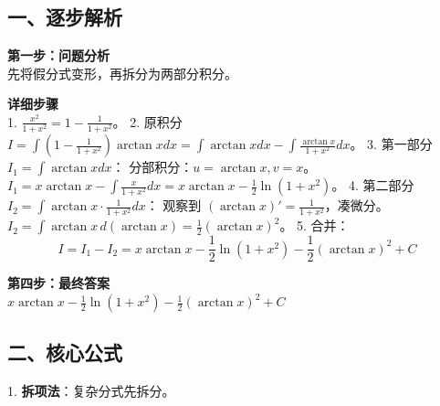\documentclass[12pt, a4paper]{ctexart}
\newenvironment{RedAnalysis}{
    \par
    \color{red} %
}{
    \par
    \color{black} %
}
\begin{document}
\begin{RedAnalysis}

\subsection*{一、逐步解析}

\textbf{第一步：问题分析} \\
先将假分式变形，再拆分为两部分积分。

\textbf{详细步骤} \\
1. $\frac{x^2}{1+x^2} = 1 - \frac{1}{1+x^2}$。
2. 原积分 $I = \int (1 - \frac{1}{1+x^2}) \arctan x dx = \int \arctan x dx - \int \frac{\arctan x}{1+x^2} dx$。
3. 第一部分 $I_1 = \int \arctan x dx$：
   分部积分：$u = \arctan x, v = x$。
   $I_1 = x \arctan x - \int \frac{x}{1+x^2} dx = x \arctan x - \frac{1}{2}\ln(1+x^2)$。
4. 第二部分 $I_2 = \int \arctan x \cdot \frac{1}{1+x^2} dx$：
   观察到 $(\arctan x)' = \frac{1}{1+x^2}$，凑微分。
   $I_2 = \int \arctan x \, d(\arctan x) = \frac{1}{2}(\arctan x)^2$。
5. 合并：
   \[ I = I_1 - I_2 = x \arctan x - \frac{1}{2}\ln(1+x^2) - \frac{1}{2}(\arctan x)^2 + C \]

\textbf{第四步：最终答案} \\
$ x \arctan x - \frac{1}{2}\ln(1+x^2) - \frac{1}{2}(\arctan x)^2 + C $

\subsection*{二、核心公式}
1. \textbf{拆项法}：复杂分式先拆分。

\end{RedAnalysis}
\end{document}
